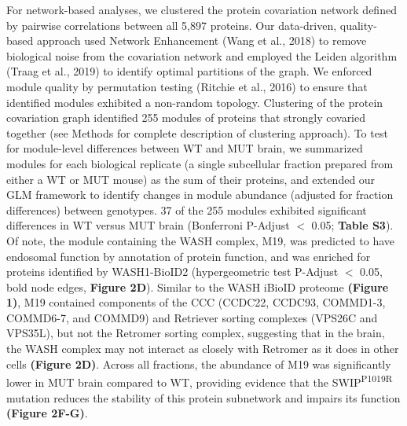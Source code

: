 For network-based analyses, we clustered the protein covariation network defined
by pairwise correlations between all 5,897 proteins. Our data-driven,
quality-based approach used Network Enhancement (Wang et al., 2018) to remove
biological noise from the covariation network and employed the Leiden algorithm
(Traag et al., 2019) to identify optimal partitions of the graph. We enforced
module quality by permutation testing (Ritchie et al., 2016) to ensure that
identified modules exhibited a non-random topology. Clustering of the protein
covariation graph identified 255 modules of proteins that strongly covaried
together (see Methods for complete description of clustering approach). 
To test for module-level differences between WT and MUT brain, we summarized
modules for each biological replicate (a single subcellular fraction prepared
from either a WT or MUT mouse) as the sum of their proteins, and extended our
GLM framework to identify changes in module abundance (adjusted for fraction
differences) between genotypes. 37 of the 255 modules exhibited significant
differences in WT versus MUT brain (Bonferroni P-Adjust  $<$ 0.05; \textbf{Table S3}). 
Of note, the module containing the WASH complex, M19, was predicted to have
endosomal function by annotation of protein function, and was enriched for
proteins identified by WASH1-BioID2 (hypergeometric test P-Adjust $<$ 0.05, bold
node edges, \textbf{Figure 2D}). Similar to the WASH iBioID proteome \textbf{(Figure 1)}, M19
contained components of the CCC (CCDC22, CCDC93, COMMD1-3, COMMD6-7, and COMMD9)
and Retriever sorting complexes (VPS26C and VPS35L), but not the Retromer
sorting complex, suggesting that in the brain, the WASH complex may not interact
as closely with Retromer as it does in other cells \textbf{(Figure 2D)}. Across all
fractions, the abundance of M19 was significantly lower in MUT brain compared to
WT, providing evidence that the SWIP\textsuperscript{P1019R} mutation reduces the stability of
this protein subnetwork and impairs its function \textbf{(Figure 2F-G)}. 

